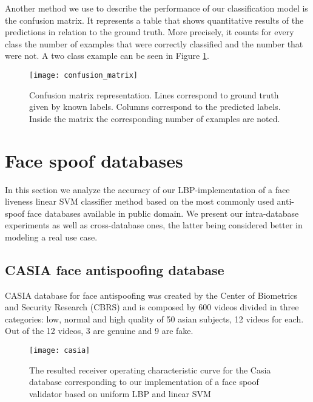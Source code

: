 Another method we use to describe the performance of our classification model is the confusion matrix. It represents a table that shows quantitative results of the predictions in relation to the ground truth. More precisely, it counts for every class the number of examples that were correctly classified and the number that were not. A two class example can be seen in Figure \ref{fig:confusion_matrix}.

\begin{figure}[H]
	\captionsetup{width=15cm,font=small}
	\begin{center}
		\texttt{[image: confusion\_matrix]}
	\end{center}
	\caption[Confusion matrix representation]{Confusion matrix representation. Lines correspond to ground truth given by known labels. Columns correspond to the predicted labels. Inside the matrix the corresponding number of examples are noted.}
	\label{fig:confusion_matrix}
\end{figure}

\section{Face spoof databases}\label{section:face_spoof_databases}
In this section we analyze the accuracy of our LBP-implementation of a face liveness linear SVM classifier method based on the most commonly used anti-spoof face databases available in public domain. We present our intra-database experiments as well as cross-database ones, the latter being considered better in modeling a real use case.
\subsection{CASIA face antispoofing database }
CASIA database for face antispoofing was created by the Center of Biometrics and Security Research (CBRS) and is composed by 600 videos divided in three categories: low, normal and high quality of 50 asian subjects, 12 videos for each. Out of the 12 videos, 3 are genuine and 9 are fake.
\begin{figure}[H]
	\captionsetup{width=15cm,font=small}
	\begin{center}
		\texttt{[image: casia]}
	\end{center}
	\caption[CASIA database reported ROC curve]{The resulted receiver operating characteristic curve for the Casia database corresponding to our implementation of a face spoof validator based on uniform LBP and linear SVM}
	\label{fig:casia_roc}
\end{figure}

